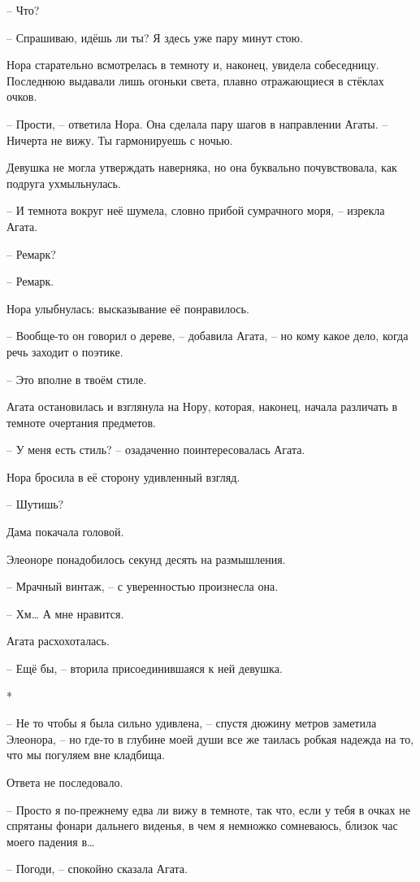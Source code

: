 \documentclass[
  a5paperpaper,
  DIV=11,
  numbers=noendperiod]{scrreprt}
\begin{document}
-- Что?

-- Спрашиваю, идёшь ли ты? Я здесь уже пару минут стою.

Нора старательно всмотрелась в темноту и, наконец, увидела собеседницу.
Последнюю выдавали лишь огоньки света, плавно отражающиеся в стёклах
очков.

-- Прости, -- ответила Нора. Она сделала пару шагов в направлении Агаты.
-- Ничерта не вижу. Ты гармонируешь с ночью.

Девушка не могла утверждать наверняка, но она буквально почувствовала,
как подруга ухмыльнулась.

-- И темнота вокруг неё шумела, словно прибой сумрачного моря, --
изрекла Агата.

-- Ремарк?

-- Ремарк.

Нора улыбнулась: высказывание её понравилось.

-- Вообще-то он говорил о дереве, -- добавила Агата, -- но кому какое
дело, когда речь заходит о поэтике.

-- Это вполне в твоём стиле.

Агата остановилась и взглянула на Нору, которая, наконец, начала
различать в темноте очертания предметов.

-- У меня есть стиль? -- озадаченно поинтересовалась Агата.

Нора бросила в её сторону удивленный взгляд.

-- Шутишь?

Дама покачала головой.

Элеоноре понадобилось секунд десять на размышления.

-- Мрачный винтаж, -- с уверенностью произнесла она.

-- Хм\ldots{} А мне нравится.

Агата расхохоталась.

-- Ещё бы, -- вторила присоединившаяся к ней девушка.

*

-- Не то чтобы я была сильно удивлена, -- спустя дюжину метров заметила
Элеонора, -- но где-то в глубине моей души все же таилась робкая надежда
на то, что мы погуляем вне кладбища.

Ответа не последовало.

-- Просто я по-прежнему едва ли вижу в темноте, так что, если у тебя в
очках не спрятаны фонари дальнего виденья, в чем я немножко сомневаюсь,
близок час моего падения в\ldots{}

-- Погоди, -- спокойно сказала Агата.
\end{document}

